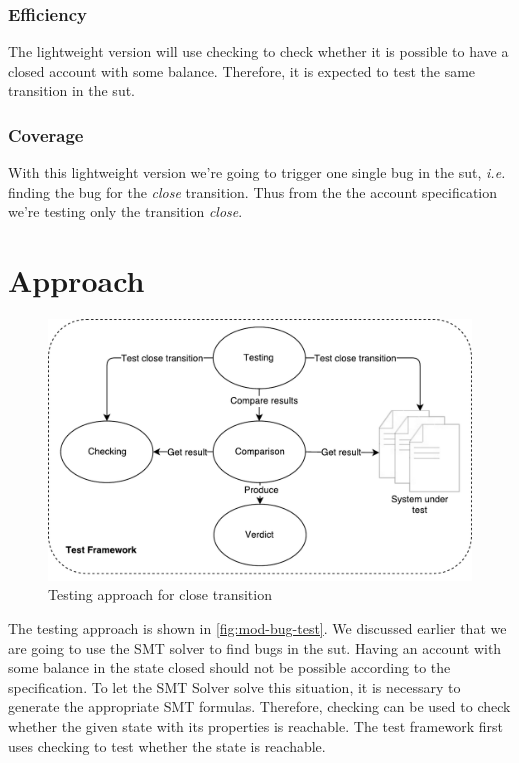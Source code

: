 \subsubsection{Efficiency}
The lightweight version will use checking to check whether it is possible to have
a closed account with some balance. Therefore, it is expected to test the same
transition in the \gls{sut}.

\subsubsection{Coverage}
With this lightweight version we're going to trigger one single bug in the \gls{sut},
\textit{i.e.} finding the bug for the \textit{close} transition. Thus from the
the account specification we're testing only the transition \textit{close}.

\section{Approach}

\begin{figure}[h!]
  \centering
  \includegraphics[width=\linewidth{}]{figures/test-modified-bug.pdf}
  \caption{Testing approach for close transition}\label{fig:mod-bug-test}
\end{figure}
\FloatBarrier

The testing approach is shown in \autoref{fig:mod-bug-test}.
We discussed earlier that we are going to use the SMT solver to find bugs in the
\gls{sut}. Having an account with some balance in the state closed should not be possible
according to the specification. To let the SMT Solver solve this situation, it
is necessary to generate the appropriate SMT formulas. Therefore, checking can
be used to check whether the given state with its properties is reachable.
The test framework first uses checking to test whether the state is reachable.

